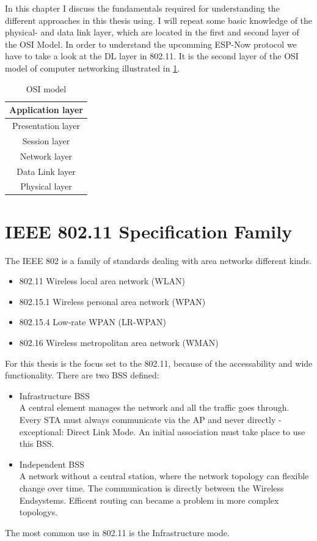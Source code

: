 \documentclass[]{ccs-thesis}
\begin{document}
In this chapter I discuss the fundamentals required for understanding the different approaches 
in this thesis using.
I will repeat some basic knowledge of the physical- and data link layer,
which are located in the first and second layer of the \ac{OSI} Model.
In order to understand the upcomming ESP-Now protocol we have to take a look at the \ac{DL} layer in 802.11.
It is the second layer of the \ac{OSI} model of computer networking illustrated in \cref{tab:OsiModel}.

\begin{table}
	\centering
	\begin{tabular}{ |c| } 
		\hline
		Application layer\\
		\hline
		Presentation layer\\
		\hline
		Session layer\\
		\hline
		Network layer\\
		\hline
		\cellcolor{yellow!25}Data Link layer\\
		\hline
		\cellcolor{yellow!25}Physical layer\\
		\hline
	\end{tabular}
	\caption{\ac{OSI} model}
	\label{tab:OsiModel}
\end{table}

\section{IEEE 802.11 Specification Family}

The \ac{IEEE} 802 is a family of standards dealing with area networks different kinds.
\begin{itemize}
	\item 802.11 Wireless local area network (WLAN)
	\item 802.15.1 Wireless personal area network (WPAN)
	\item 802.15.4 Low-rate WPAN (LR-WPAN)
	\item 802.16 Wireless metropolitan area network (WMAN)
\end{itemize}

For this thesis is the focus set to the 802.11, because of the accessability and wide functionality.
There are two \ac{BSS} defined:
\begin{itemize}
	\item Infrastructure BSS\\
	A central element manages the network and all the traffic goes through. 
	Every \ac{STA} must always communicate via the \ac{AP} and never directly - exceptional: Direct Link Mode.
	An initial association must take place to use this \ac{BSS}.
	\item Independent BSS\\
	A network without a central station, where the network topology can flexible change over time.
	The communication is directly between the Wireless Endsystems.
	Efficent routing can became a problem in more complex topologys.
\end{itemize}
The most common use in 802.11 is the Infrastructure mode.\\ 
\end{document}
